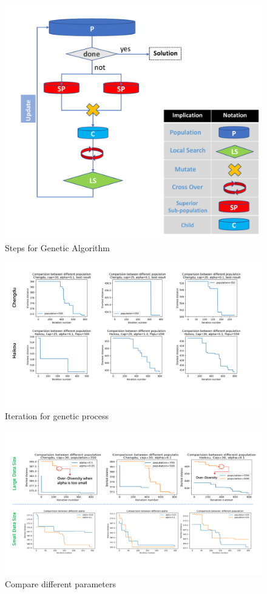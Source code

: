 \documentclass{llncs}
\begin{document}
 
 
 
	\begin{figure}[htbp]
		\centering
		\includegraphics[width=4.5in]{ga.pdf}
		\caption{Steps for Genetic Algorithm}
		\label{ga-fig}
	\end{figure}
	
	\begin{figure}[htbp]
		\centering
		\includegraphics[width=5.5in]{GAplt.pdf}
		\caption{Iteration for genetic process}
		\label{plt-fig}
	\end{figure}
	
	\begin{figure}[htbp]
		\centering
		\includegraphics[width=5.5in]{cmp.pdf}
		\caption{Compare different parameters}
		\label{cmp-fig}
	\end{figure}
\end{document}
